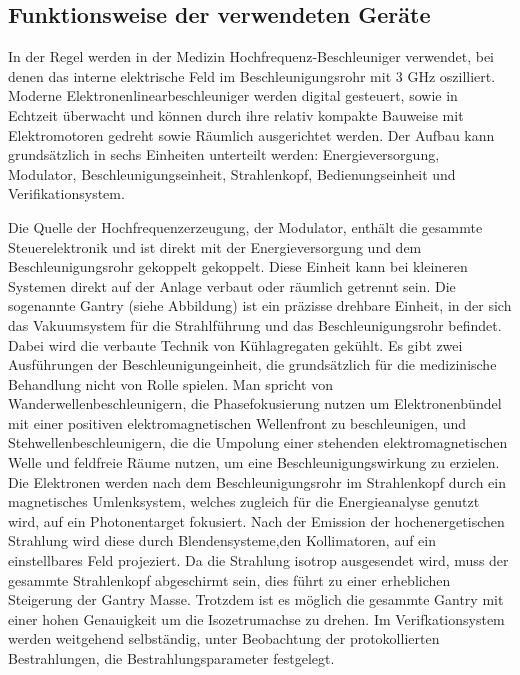 





\subsection{Funktionsweise der verwendeten Geräte}
In der Regel werden in der Medizin Hochfrequenz-Beschleuniger verwendet, bei denen das interne elektrische Feld 
im Beschleunigungsrohr mit 3 GHz oszilliert. 
Moderne Elektronenlinearbeschleuniger werden digital gesteuert, sowie in Echtzeit überwacht und können durch ihre relativ kompakte Bauweise
mit Elektromotoren gedreht sowie Räumlich ausgerichtet werden.
Der Aufbau kann grundsätzlich in sechs Einheiten unterteilt werden: Energieversorgung, Modulator, Beschleunigungseinheit, Strahlenkopf, Bedienungseinheit und Verifikationsystem. \cite{KriegerHannoSfTu}


Die Quelle der Hochfrequenzerzeugung, der Modulator, enthält die gesammte Steuerelektronik und ist direkt mit der Energieversorgung und dem Beschleunigungsrohr gekoppelt gekoppelt.
Diese Einheit kann bei kleineren Systemen direkt auf der Anlage verbaut oder räumlich getrennt sein.
Die sogenannte Gantry (siehe Abbildung) ist ein präzisse drehbare Einheit, in der sich das Vakuumsystem für die Strahlführung und das Beschleunigungsrohr befindet.
Dabei wird die verbaute Technik von Kühlagregaten gekühlt.
Es gibt zwei Ausführungen der Beschleunigungeinheit, die grundsätzlich für die medizinische Behandlung nicht von Rolle spielen.
Man spricht von Wanderwellenbeschleunigern, die Phasefokusierung nutzen um Elektronenbündel mit einer positiven elektromagnetischen Wellenfront zu beschleunigen,
und Stehwellenbeschleunigern, die die Umpolung einer stehenden elektromagnetischen Welle und feldfreie Räume nutzen, um eine Beschleunigungswirkung zu erzielen.
Die Elektronen werden nach dem Beschleunigungsrohr im Strahlenkopf durch ein magnetisches Umlenksystem, welches zugleich für die Energieanalyse genutzt wird, auf ein Photonentarget fokusiert.
Nach der Emission der hochenergetischen Strahlung wird diese durch Blendensysteme,den Kollimatoren, auf ein einstellbares Feld projeziert.
Da die Strahlung isotrop ausgesendet wird, muss der gesammte Strahlenkopf abgeschirmt sein, dies führt zu einer erheblichen Steigerung der Gantry Masse.
Trotzdem ist es möglich die gesammte Gantry mit einer hohen Genauigkeit um die Isozetrumachse zu drehen.
Im Verifkationsystem werden weitgehend selbständig, unter Beobachtung der protokollierten Bestrahlungen, die Bestrahlungsparameter festgelegt.\cite{KriegerHannoSfTu}

